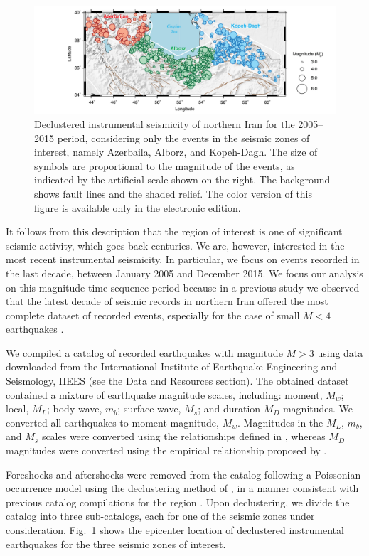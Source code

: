 \begin{figure}[t]
	\centering
	\includegraphics[width=\textwidth]{figures/pdf/figure-03} 
	\caption{Declustered instrumental seismicity of northern Iran for the 2005--2015 period, considering only the events in the seismic zones of interest, namely Azerbaila, Alborz, and Kopeh-Dagh. The size of symbols are proportional to the magnitude of the events, as indicated by the artificial scale shown on the right. The background shows fault lines and the shaded relief. The color version of this figure is available only in the electronic edition.}
	\label{fig:seismicity}
\end{figure}

It follows from this description that the region of interest is one of significant seismic activity, which goes back centuries. We are, however, interested in the most recent instrumental seismicity. In particular, we focus on events recorded in the last decade, between January 2005 and December 2015. We focus our analysis on this magnitude-time sequence period because in a previous study we observed that the latest decade of seismic records in northern Iran offered the most complete dataset of recorded events, especially for the case of small $M < 4$ earthquakes \citep[e.g.][]{Khoshnevis2016}.

We compiled a catalog of recorded earthquakes with magnitude $M>3$ using data downloaded from the International Institute of Earthquake Engineering and Seismology, IIEES (see the Data and Resources section). The obtained dataset contained a mixture of earthquake magnitude scales, including: moment, $M_w$; local, $M_L$; body wave, $m_b$; surface wave, $M_s$; and duration $M_D$ magnitudes. We converted all earthquakes to moment magnitude, $M_w$. Magnitudes in the $M_L$, $m_b$, and $M_s$ scales were converted using the relationships defined in \citet{Zare2014}, whereas $M_D$ magnitudes were converted using the empirical relationship proposed by \citet{Deniz2010}.

Foreshocks and aftershocks were removed from the catalog following a Poissonian occurrence model using the declustering method of \citet{Gardner1974}, in a manner consistent with previous catalog compilations for the region \citep[e.g.,][]{Zare2014}. Upon declustering, we divide the catalog into three sub-catalogs, each for one of the seismic zones under consideration. Fig.~\ref{fig:seismicity} shows the epicenter location of declustered instrumental earthquakes for the three seismic zones of interest.

